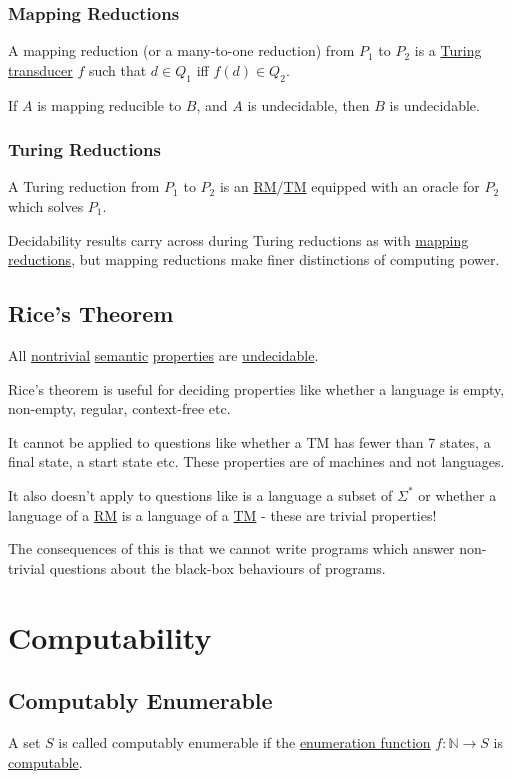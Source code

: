 \documentclass{article}
\begin{document}
\subsubsection{Mapping Reductions}\label{mapping-reduction}
A mapping reduction (or a many-to-one reduction) from $P_1$ to $P_2$ is a \hyperref[turing-transducer]{Turing transducer} $f$ such that $d \in Q_1$ iff $f(d) \in Q_2$.

If $A$ is mapping reducible to $B$, and $A$ is undecidable, then $B$ is undecidable.

\subsubsection{Turing Reductions}\label{turing-reduction}
A Turing reduction from $P_1$ to $P_2$ is an \hyperref[rm]{RM}/\hyperref[tm]{TM} equipped with an oracle for $P_2$ which solves $P_1$.

Decidability results carry across during Turing reductions as with \hyperref[mapping-reduction]{mapping reductions}, but mapping reductions make finer distinctions of computing power.


\subsection{Rice's Theorem}
All \hyperref[nontrivial]{nontrivial} \hyperref[semantic]{semantic} \hyperref[property]{properties} are \hyperref[undecidable]{undecidable}.

Rice's theorem is useful for deciding properties like whether a language is empty, non-empty, regular, context-free etc.

It cannot be applied to questions like whether a TM has fewer than 7 states, a final state, a start state etc. These properties are of machines and not languages.

It also doesn't apply to questions like is a language a subset of $\Sigma^*$ or whether a language of a \hyperref[rm]{RM} is a language of a \hyperref[tm]{TM} - these are trivial properties!

The consequences of this is that we cannot write programs which answer non-trivial questions about the black-box behaviours of programs.

\newpage

\section{Computability}

\subsection{Computably Enumerable}
A set $S$ is called computably enumerable if the \hyperref[enumerable]{enumeration function} $f : \mathbb{N} \to S$ is \hyperref[computable]{computable}.
\end{document}
